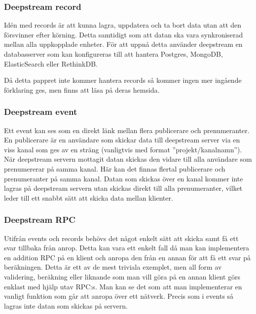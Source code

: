 \subsubsection{Deepstream record}
Idén med records\cite{ds:record} är att kunna lagra, uppdatera och ta bort data utan att den försvinner efter körning. Detta samtidigt som att datan ska vara synkroniserad mellan alla uppkopplade enheter. För att uppnå detta använder deepstream en databasserver som kan konfigureras till att hantera Postgres, MongoDB, ElasticSearch eller RethinkDB. 

Då detta pappret inte kommer hantera records så kommer ingen mer ingående förklaring ges, men finns att läsa på deras hemsida\cite{ds-storingdata}.

\subsubsection{Deepstream event}
Ett event\cite{ds:event} kan ses som en direkt länk mellan flera publicerare och prenumeranter. En publicerare är en användare som skickar data till deepstream server via en viss kanal som ges av en sträng (vanligtvis med format ''projekt/kanalnamn''). När deepstream servern mottagit datan skickas den vidare till alla användare som prenumererar på samma kanal. Här kan det finnas flertal publicerare och prenumeranter på samma kanal. Datan som skickas över en kanal kommer inte lagras på deepstream servern utan skickas direkt till alla prenumeranter, vilket leder till ett snabbt sätt att skicka data mellan klienter.

\subsubsection{Deepstream RPC}
Utifrån events och records behövs det något enkelt sätt att skicka samt få ett svar tillbaka från anrop. Detta kan vara ett enkelt fall då man kan implementera en addition RPC\cite{ds:rpc} på en klient och anropa den från en annan för att få ett svar på beräkningen. Detta är ett av de mest triviala exemplet, men all form av validering, beräkning eller liknande som man vill göra på en annan klient görs enklast med hjälp utav RPC:s. Man kan se det som att man implementerar en vanligt funktion som går att anropa över ett nätverk. Precis som i events så lagras inte datan som skickas på servern.

